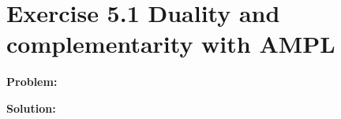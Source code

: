 \section{Exercise 5.1 Duality and complementarity with AMPL}
\textbf{Problem:} 

\textbf{Solution:}

